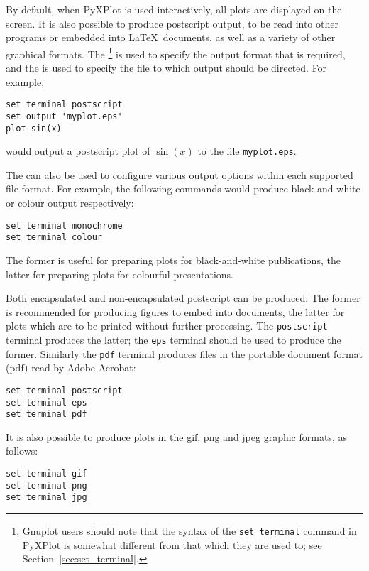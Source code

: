 By default, when PyXPlot is used interactively, all plots are displayed on the
screen. It is also possible to produce postscript output, to be read into other
programs or embedded into \LaTeX\ documents, as well as a variety of other
graphical formats. The \footnote{Gnuplot users should
note that the syntax of the {\tt set terminal} command in PyXPlot is somewhat
different from that which they are used to; see
Section~\ref{sec:set_terminal}.} is used to specify the output format that is
required, and the  is used to specify the file to which
output should be directed. For example,

\begin{verbatim}
set terminal postscript
set output 'myplot.eps'
plot sin(x)
\end{verbatim}

\noindent would output a postscript plot of $\sin(x)$ to the file
{\tt myplot.eps}.

The  can also be used to configure various output options
within each supported file format.  For example, the following commands would
produce black-and-white or colour output respectively:

\begin{verbatim}
set terminal monochrome
set terminal colour
\end{verbatim}

\noindent The former is useful for preparing plots for black-and-white
publications, the latter for preparing plots for colourful presentations.

Both encapsulated and non-encapsulated postscript can be produced. The former
is recommended for producing figures to embed into documents, the latter for
plots which are to be printed without further processing. The
{\tt postscript} terminal produces the latter; the {\tt eps} terminal
should be used to produce the former.  Similarly the {\tt pdf} terminal
produces files in the portable document format (pdf) read by
Adobe Acrobat:

\begin{verbatim}
set terminal postscript
set terminal eps
set terminal pdf
\end{verbatim}

It is also possible to produce plots in the gif, png and jpeg graphic formats,
as follows:

\begin{verbatim}
set terminal gif
set terminal png
set terminal jpg
\end{verbatim}

